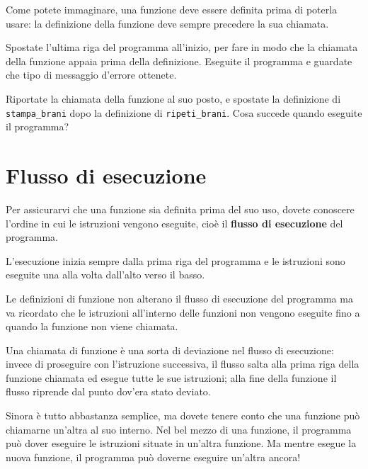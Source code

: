 \documentclass[10pt]{book}
\begin{document}
Come potete immaginare, una funzione deve essere definita prima di poterla usare: la definizione della funzione deve sempre precedere la sua chiamata.
\vspace{0.2in}
\begin{exercise}

Spostate l'ultima riga del programma all'inizio, per fare in modo che la chiamata della funzione appaia prima della definizione. Eseguite il programma e guardate che tipo di messaggio d'errore ottenete.

\end{exercise}
\vspace{0.2in}
\begin{exercise}

Riportate la chiamata della funzione al suo posto, e spostate la definizione di \verb"stampa_brani" dopo la definizione di \verb"ripeti_brani". Cosa succede quando eseguite il programma?

\end{exercise}


\section{Flusso di esecuzione}

Per assicurarvi che una funzione sia definita prima del suo uso, dovete conoscere l'ordine in cui le istruzioni vengono eseguite, cioè il {\bf flusso di esecuzione} del programma.

L'esecuzione inizia sempre dalla prima riga del programma e le istruzioni sono eseguite una alla volta dall'alto verso il basso.

Le definizioni di funzione non alterano il flusso di esecuzione del programma ma va ricordato che le istruzioni all'interno delle funzioni non vengono eseguite fino a quando la funzione non viene chiamata. 

Una chiamata di funzione è una sorta di deviazione nel flusso di esecuzione: invece di proseguire con l'istruzione successiva, il flusso salta alla prima riga della funzione chiamata ed esegue tutte le sue istruzioni; alla fine della funzione il flusso riprende dal punto dov'era stato deviato.

Sinora è tutto abbastanza semplice, ma dovete tenere conto che una funzione può chiamarne un'altra al suo interno. Nel bel mezzo di una funzione, il programma può dover eseguire le istruzioni situate in un'altra funzione. Ma mentre esegue la nuova funzione, il programma può doverne eseguire un'altra ancora!
\end{document}
